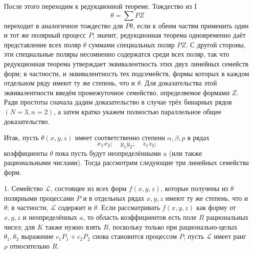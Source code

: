 \documentclass[11pt]{article}
\begin{document}
После этого переходим к редукционной теореме. Тождество из I
\[
  \theta=\sum PZ
\]
переходит в аналогичное тождество для $P\theta$, если к обеим частям применить один и тот же полярный процесс $P$; значит, редукционная теорема одновременно даёт представление всех поляр $\theta$ суммами специальных поляр $PZ$. С другой стороны, эти специальные поляры несомненно содержатся среди всех поляр, так что редукционная теорема утверждает эквивалентность этих двух линейных семейств форм; в частности, и эквивалентность тех подсемейств, формы которых в каждом отдельном ряду имеют ту же степень, что и $\theta$. Для доказательства этой эквивалентности введём промежуточное семейство, определяемое формами $Z$. Ради простоты сначала дадим доказательство в случае трёх бинарных рядов $(N=3,n=2)$, а затем кратко укажем полностью параллельное общее доказательство.

Итак, пусть $\theta(x,y,z)$ имеет соответственно степени $\alpha,\beta,p$ в рядах
\[
  x_1x_2;\quad y_1y_2;\quad z_1z_2;
\]
коэффициенты $\theta$ пока пусть будут неопределёнными $a$ (или также рациональными числами). Тогда рассмотрим следующие три линейных семейства форм.

1. Семейство $\mathcal L$, состоящее из всех форм $f(x,y,z)$, которые получены из $\theta$ полярными процессами $P$ и в отдельных рядах $x,y,z$ имеют ту же степень, что и $\theta$; в частности, $\mathcal L$ содержит и $\theta$. Если рассматривать $f(x,y,z)$ как форму от $x,y,z$ и неопределённых $a$, то область коэффициентов есть поле $R$ рациональных чисел; для $K$ также нужно взять $R$, поскольку только при рационально-целых $\theta_1,\theta_2$ выражение $c_1P_1+c_2P_2$ снова становится процессом $P$; пусть $\mathcal L$ имеет ранг $\rho$ относительно $R$.
\end{document}
